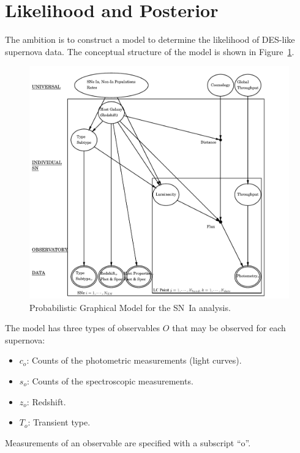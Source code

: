 \documentclass[preprint,3p]{elsarticle}
\begin{document}
%
%

\section{Likelihood and Posterior}
\label{likelihood:sec}

The ambition is to construct a model to determine the likelihood of DES-like
supernova data. 
The conceptual structure of the model is shown in Figure~\ref{pgm:fig}. 
\begin{figure}[htbp] %
   \centering
   \includegraphics[width=6.5in]{../results//hdpgm.pdf} 
   \caption{Probabilistic Graphical Model for the SN~Ia analysis.  
   \label{pgm:fig}}
\end{figure}

The model has three types of observables $O$ that
may be observed for each supernova:
\begin{itemize}
\item $c_o$: Counts of the photometric measurements (light curves).
\item $s_o$: Counts of the spectroscopic measurements.
\item $z_o$: Redshift.
\item $T_o$: Transient type.
\end{itemize}
Measurements of an observable are specified with a subscript ``o''.
\end{document}
